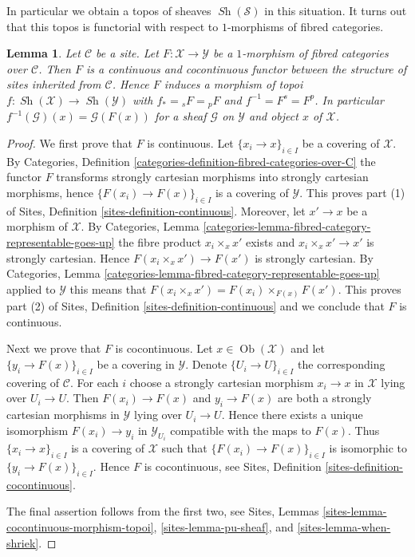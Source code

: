 \documentclass{stacks-project}
\theoremstyle{plain}
\newtheorem{lemma}[subsection]{Lemma}
\theoremstyle{definition}
\theoremstyle{remark}
\numberwithin{equation}{subsection}
\def\Ob{\mathop{\mathrm{Ob}}\nolimits}
\def\Sh{\mathop{\mathit{Sh}}\nolimits}
\begin{document}
\noindent
In particular we obtain a topos of sheaves $\Sh(\mathcal{S})$
in this situation. It turns out that this topos is functorial with respect
to $1$-morphisms of fibred categories.

\begin{lemma}
\label{lemma-topology-inherited-functorial}
Let $\mathcal{C}$ be a site. Let $F : \mathcal{X} \to \mathcal{Y}$
be a $1$-morphism of fibred categories over $\mathcal{C}$.
Then $F$ is a continuous and cocontinuous functor between the structure
of sites inherited from $\mathcal{C}$. Hence $F$ induces a morphism of topoi
$f : \Sh(\mathcal{X}) \to \Sh(\mathcal{Y})$ with
$f_* = {}_sF = {}_pF$ and $f^{-1} = F^s = F^p$. In particular
$f^{-1}(\mathcal{G})(x) = \mathcal{G}(F(x))$
for a sheaf $\mathcal{G}$ on $\mathcal{Y}$ and object $x$ of $\mathcal{X}$.
\end{lemma}

\begin{proof}
We first prove that $F$ is continuous.
Let $\{x_i \to x\}_{i \in I}$ be a covering of $\mathcal{X}$. By
Categories, Definition \ref{categories-definition-fibred-categories-over-C}
the functor $F$ transforms strongly cartesian morphisms into strongly
cartesian morphisms, hence $\{F(x_i) \to F(x)\}_{i \in I}$ is a covering
of $\mathcal{Y}$. This proves part (1) of
Sites, Definition \ref{sites-definition-continuous}.
Moreover, let $x' \to x$ be a morphism of $\mathcal{X}$. By
Categories, Lemma \ref{categories-lemma-fibred-category-representable-goes-up}
the fibre product $x_i \times_x x'$ exists and $x_i \times_x x' \to x'$
is strongly cartesian. Hence $F(x_i \times_x x') \to F(x')$ is strongly
cartesian. By
Categories, Lemma \ref{categories-lemma-fibred-category-representable-goes-up}
applied to $\mathcal{Y}$ this means that
$F(x_i \times_x x') = F(x_i) \times_{F(x)} F(x')$.
This proves part (2) of
Sites, Definition \ref{sites-definition-continuous}
and we conclude that $F$ is continuous.

\medskip\noindent
Next we prove that $F$ is cocontinuous.
Let $x \in \Ob(\mathcal{X})$ and let $\{y_i \to F(x)\}_{i \in I}$
be a covering in $\mathcal{Y}$. Denote $\{U_i \to U\}_{i \in I}$ the
corresponding covering of $\mathcal{C}$. For each $i$ choose a strongly
cartesian morphism $x_i \to x$ in $\mathcal{X}$ lying over $U_i \to U$.
Then $F(x_i) \to F(x)$ and $y_i \to F(x)$ are both a strongly cartesian
morphisms in $\mathcal{Y}$ lying over $U_i \to U$. Hence there exists
a unique isomorphism $F(x_i) \to y_i$ in $\mathcal{Y}_{U_i}$ compatible
with the maps to $F(x)$. Thus $\{x_i \to x\}_{i \in I}$ is a covering of
$\mathcal{X}$ such that $\{F(x_i) \to F(x)\}_{i \in I}$ is isomorphic to
$\{y_i \to F(x)\}_{i \in I}$. Hence $F$ is cocontinuous, see
Sites, Definition \ref{sites-definition-cocontinuous}.

\medskip\noindent
The final assertion follows from the first two, see
Sites, Lemmas
\ref{sites-lemma-cocontinuous-morphism-topoi},
\ref{sites-lemma-pu-sheaf}, and
\ref{sites-lemma-when-shriek}.
\end{proof}
\end{document}
